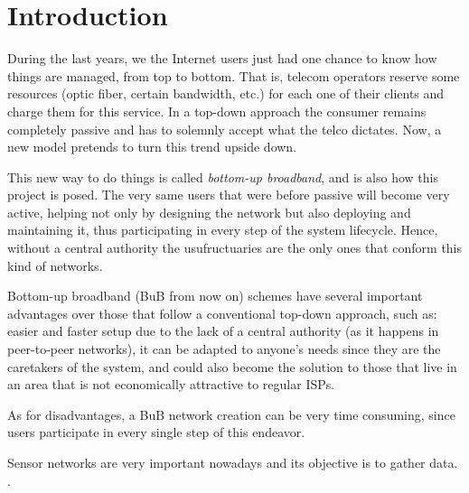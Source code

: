 
\chapter{Introduction} %

\label{Chapter1} %



During the last years, we the Internet users just had one chance to know how things are managed, from top to bottom. That is, telecom operators reserve some resources (optic fiber, certain bandwidth, etc.) for each one of their clients and charge them for this service. In a top-down approach the consumer remains completely passive and has to solemnly accept what the telco dictates. Now, a new model pretends to turn this trend upside down.

This new way to do things is called \emph{bottom-up broadband}, and is also how this project is posed. The very same users that were before passive will become very active, helping not only by designing the network but also deploying and maintaining it, thus participating in every step of the system lifecycle. Hence, without a central authority the usufructuaries are the only ones that conform this kind of networks.

Bottom-up broadband (BuB from now on) schemes have several important advantages over those that follow a conventional top-down approach, such as: easier and faster setup due to the lack of a central authority (as it happens in peer-to-peer networks), it can be adapted to anyone's needs since they are the caretakers of the system, and could also become the solution to those that live in an area that is not economically attractive to regular ISPs\citep{}. %

As for disadvantages, a BuB network creation can be very time consuming, since users participate in every single step of this endeavor\citep{}. %

Sensor networks are very important nowadays and its objective is to gather data. \citep{}. %

